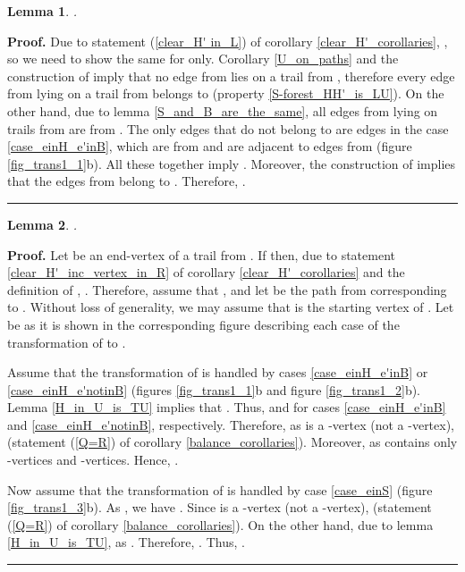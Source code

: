 \documentclass[a4paper, 12pt]{article}
\newtheorem{lemma}{Lemma}[subsection]
\newenvironment{proof}[1][Proof]{\noindent\textbf{#1.} }{\ \rule{0.5em}{0.5em}}
\begin{document}
\begin{lemma} \label{LB_alternating_paths}
.
\end{lemma}
\begin{proof}
Due to statement (\ref{clear_H' in_L}) of corollary
\ref{clear_H'_corollaries}, , so we need to show the same for  only.
Corollary \ref{U_on_paths} and the construction of  imply that no
edge from  lies on a trail from , therefore every edge from
 lying on a trail from  belongs to  (property
\ref{S-forest_HH'_is_LU}). On the other hand, due to lemma
\ref{S_and_B_are_the_same}, all edges from  lying on trails from
 are from . The only edges that do not belong to  are edges  in the case \ref{case_einH_e'inB}, which are
from  and are adjacent to edges from  (figure
\ref{fig_trans1_1}b). All these together imply . Moreover, the construction of  implies that the edges
from  belong to . Therefore, .
\end{proof}

\begin{lemma} \label{endvertices_of_A'_in_Q_LcupQ_B}
.
\end{lemma}
\begin{proof}
Let  be an end-vertex of a trail  from . If  then, due to statement
\ref{clear_H'_inc_vertex_in_R} of corollary
\ref{clear_H'_corollaries} and the definition of
, .
Therefore, assume that , and let  be the path from
 corresponding to . Without loss of generality, we may
assume that  is the starting vertex of . Let  be
as it is shown in the corresponding figure describing each case of
the transformation of  to .

Assume that the transformation of  is handled by cases
\ref{case_einH_e'inB} or \ref{case_einH_e'notinB} (figures
\ref{fig_trans1_1}b and figure \ref{fig_trans1_2}b). Lemma
\ref{H_in_U_is_TU} implies that . Thus,  and 
for cases \ref{case_einH_e'inB} and \ref{case_einH_e'notinB},
respectively. Therefore, as  is a -vertex (not a -vertex),
 (statement (\ref{Q=R}) of
corollary \ref{balance_corollaries}). Moreover,  as
 contains only -vertices and -vertices. Hence, .

Now assume that the transformation of  is handled by case
\ref{case_einS} (figure \ref{fig_trans1_3}b). As , we have . Since  is a -vertex (not
a -vertex),  (statement
(\ref{Q=R}) of corollary \ref{balance_corollaries}). On the other
hand, due to lemma \ref{H_in_U_is_TU},  as .
Therefore, . Thus, .
\end{proof}
\end{document}
